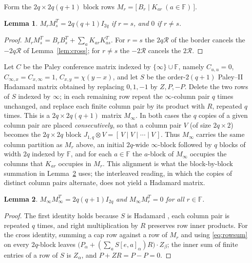 \documentclass[11pt]{article}
\newtheorem{lemma}{Lemma}
\newcommand{\F}{\mathbb F}
\newcommand{\J}{J}
\newcommand{\Rcal}{\mathcal R}
\begin{document}
Form the \(2q\times2q(q+1)\) block rows
\(M_r=\bigl[\,B_r\mid K_{ar}\ (a\in\F)\,\bigr].\)

\begin{lemma}\label{lem:finite}
\(M_rM_s^{T}=2q(q+1)I_{2q}\) if \(r=s\), and \(0\) if \(r\neq s\).
\end{lemma}

\begin{proof}
\(M_rM_s^{T}=B_rB_s^{T}+\sum_aK_{ar}K_{as}^{T}\).  For \(r=s\) the
\(2q\Rcal\) of the border cancels the \(-2q\Rcal\) of
Lemma~\ref{lem:cross}; for \(r\neq s\) the \(-2\Rcal\) cancels the
\(2\Rcal\).
\end{proof}

Let \(C\) be the Paley conference matrix indexed by
\(\{\infty\}\cup\F\), namely \(C_{u,u}=0\),
\(C_{\infty,x}=C_{x,\infty}=1\), \(C_{x,y}=\chi(y-x)\), and let \(S\) be
the order-\(2(q+1)\) Paley--II Hadamard matrix obtained by replacing
\(0,1,-1\) by \(Z,P,-P\).  Delete the two rows of \(S\) indexed by
\(\infty\); in each remaining row repeat the \(\infty\)-column pair
\(q\) times unchanged, and replace each finite column pair by its
product with \(R\), repeated \(q\) times.  This is a
\(2q\times2q(q+1)\) matrix \(M_\infty\).  In both cases the \(q\) copies
of a given column pair are placed \emph{consecutively}, so that a column
pair \(V\) (of size \(2q\times2\)) becomes the \(2q\times2q\) block
\(\J_{1,q}\otimes V=[\,V\mid V\mid\cdots\mid V\,]\).
Thus \(M_\infty\) carries the same column partition as \(M_r\)
above, an initial \(2q\)-wide \(\infty\)-block followed by \(q\) blocks
of width \(2q\) indexed by \(\F\), and for each \(a\in\F\) the
\(a\)-block of \(M_\infty\) occupies the columns that \(K_{ar}\) occupies
in \(M_r\).  This alignment is what the block-by-block summation in
Lemma~\ref{lem:cap} uses; the interleaved reading, in which the copies of
distinct column pairs alternate, does not yield a Hadamard matrix.

\begin{lemma}\label{lem:cap}
\(M_\infty M_\infty^{T}=2q(q+1)I_{2q}\) and \(M_\infty M_r^{T}=0\) for all
\(r\in\F\).
\end{lemma}

\begin{proof}
The first identity holds because \(S\) is Hadamard \cite{Paley1933}, each column pair is
repeated \(q\) times, and right multiplication by \(R\) preserves row
inner products.  For the cross identity, summing a cap row against a row
of \(M_r\) and using \eqref{eq:rowsum} on every \(2q\)-block leaves
\(\bigl(P_\alpha+(\sum_{a}S[e,a]_\alpha)R\bigr)\cdot Z_\beta\); the inner
sum of finite entries of a row of \(S\) is \(Z_\alpha\), and
\(P+ZR=P-P=0\).
\end{proof}
\end{document}
